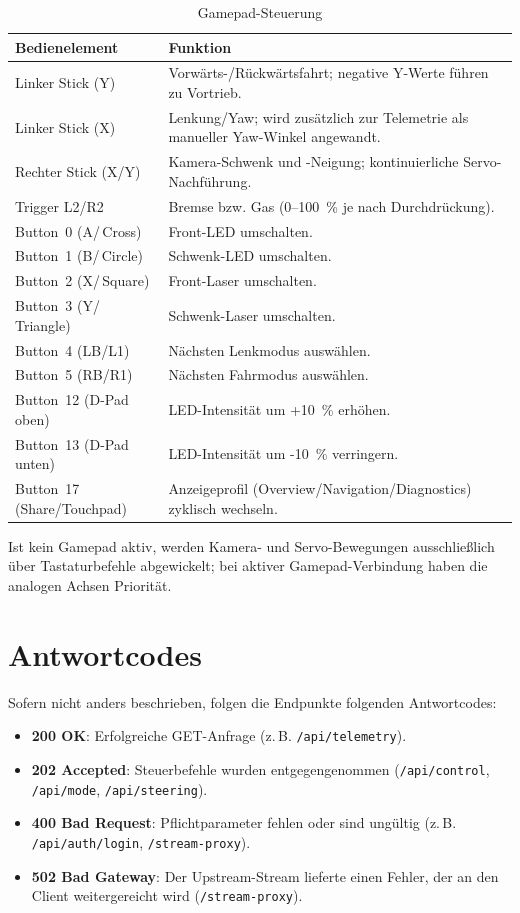 \documentclass[a4paper,11pt]{article}
\begin{document}
\begin{longtable}{p{4cm}p{9cm}}
\caption{Gamepad-Steuerung}\label{tab:gamepad}\\
\textbf{Bedienelement} & \textbf{Funktion}\\\hline
Linker Stick (Y) & Vorwärts-/Rückwärtsfahrt; negative Y-Werte führen zu Vortrieb.\\
Linker Stick (X) & Lenkung/Yaw; wird zusätzlich zur Telemetrie als manueller Yaw-Winkel angewandt.\\
Rechter Stick (X/Y) & Kamera-Schwenk und -Neigung; kontinuierliche Servo-Nachführung.\\
Trigger L2/R2 & Bremse bzw. Gas (0--100~\% je nach Durchdrückung).\\
Button~0 (A/\,Cross) & Front-LED umschalten.\\
Button~1 (B/\,Circle) & Schwenk-LED umschalten.\\
Button~2 (X/\,Square) & Front-Laser umschalten.\\
Button~3 (Y/\,Triangle) & Schwenk-Laser umschalten.\\
Button~4 (LB/L1) & Nächsten Lenkmodus auswählen.\\
Button~5 (RB/R1) & Nächsten Fahrmodus auswählen.\\
Button~12 (D-Pad oben) & LED-Intensität um +10~\% erhöhen.\\
Button~13 (D-Pad unten) & LED-Intensität um -10~\% verringern.\\
Button~17 (Share/Touchpad) & Anzeigeprofil (Overview/Navigation/Diagnostics) zyklisch wechseln.\\
\end{longtable}

Ist kein Gamepad aktiv, werden Kamera- und Servo-Bewegungen ausschließlich über Tastaturbefehle abgewickelt; bei aktiver
Gamepad-Verbindung haben die analogen Achsen Priorität.



\section{Antwortcodes}
Sofern nicht anders beschrieben, folgen die Endpunkte folgenden Antwortcodes:
\begin{itemize}
  \item \textbf{200 OK}: Erfolgreiche GET-Anfrage (z.\,B. \texttt{/api/telemetry}).
  \item \textbf{202 Accepted}: Steuerbefehle wurden entgegengenommen (\texttt{/api/control}, \texttt{/api/mode}, \texttt{/api/steering}).
  \item \textbf{400 Bad Request}: Pflichtparameter fehlen oder sind ungültig (z.\,B. \texttt{/api/auth/login}, \texttt{/stream-proxy}).
  \item \textbf{502 Bad Gateway}: Der Upstream-Stream lieferte einen Fehler, der an den Client weitergereicht wird (\texttt{/stream-proxy}).
\end{itemize}
\end{document}
